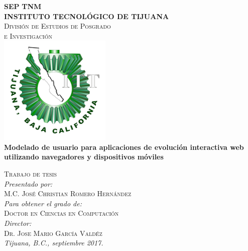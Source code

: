 \documentclass{article}
\begin{document}
\begin{center}
{\textsc{\LARGE \textbf{SEP} } \hfill  \textsc{\LARGE \textbf{TNM}}}\\[0.2cm]
	\textsc{\LARGE \textbf{INSTITUTO TECNOL\'OGICO DE TIJUANA}\\[0.5cm]
	\textsc{\Large Divisi\'on de Estudios de Posgrado }\\[0.1cm]
	\textsc{\Large e Investigaci\'on }}\\[0.5cm]
	\includegraphics[width=0.4\textwidth]{img/logotec1}\\[0.3cm] %
	{ \LARGE \bfseries Modelado de usuario para aplicaciones de evoluci\'on interactiva web utilizando navegadores y dispositivos m\'oviles}\\ [1.0cm]
\end{center}

 \begin{minipage}{1.0\textwidth}
 	\begin{flushright}
 	\textsc{Trabajo de tesis}\\[0.3cm]
 	\emph{Presentado por:} \\
 	\textsc{ M.C. Jos\'e Christian Romero Hern\'andez}\\
	\emph{Para obtener el grado de:} \\
 	\textsc{Doctor en Ciencias en Computaci\'on} \\
	\emph{Director:} \\
 	\textsc{Dr. Jose Mario Garc\'ia Vald\'ez} \\
 	\vspace{4 mm}
	\emph{Tijuana, B.C., septiembre 2017.}
 	\end{flushright}
\end{minipage}


\pagestyle{empty} %
\end{document}
